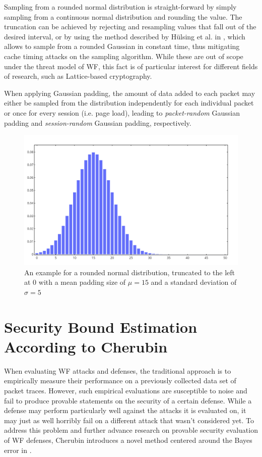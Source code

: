 \documentclass[
	ruledheaders=chapter,
	class=report,
	thesis={type=master, department=inf},
	accentcolor=1c,
	custommargins=true,
	marginpar=false,
	parskip=half-,
	fontsize=11pt,
]{tudapub}
\begin{document}
	Sampling from a rounded normal distribution is straight-forward by simply sampling from a continuous normal distribution and rounding the value. The truncation can be achieved by rejecting and resampling values that fall out of the desired interval, or by using the method described by Hülsing et al. in \cite{Huelsing2018}, which allows to sample from a rounded Gaussian in constant time, thus mitigating cache timing attacks on the sampling algorithm. While these are out of scope under the threat model of WF, this fact is of particular interest for different fields of research, such as Lattice-based cryptography. \cite{Huelsing2018}
	
	When applying Gaussian padding, the amount of data added to each packet may either be sampled from the distribution independently for each individual packet or once for every session (i.e. page load), leading to \textit{packet-random} Gaussian padding and \textit{session-random} Gaussian padding, respectively.
	
	\begin{figure}[tb]
		\centering
		\includegraphics[width=\textwidth]{truncated_rounded_normal.png}
		\caption{An example for a rounded normal distribution, truncated to the left at 0 with a mean padding size of $\mu = 15$ and a standard deviation of $\sigma = 5$ }
		\label{fig:trunc_gauss}
	\end{figure}
	
	\section[Security Bound Estimation]{Security Bound Estimation According to Cherubin \cite{Cherubin2017}}
	\label{cherubin_bounds}
	
	When evaluating WF attacks and defenses, the traditional approach is to empirically measure their performance on a previously collected data set of packet traces. However, such empirical
	evaluations are susceptible to noise and fail to produce provable statements on the security of
	a certain defense. While a defense may perform particularly well against the attacks it is evaluated on, it may just as well horribly fail on a different attack that wasn't considered yet. To address this problem and further advance research on provable security evaluation of WF defenses, Cherubin introduces a novel method centered around the Bayes error in \cite{Cherubin2017}.
	
\end{document}
